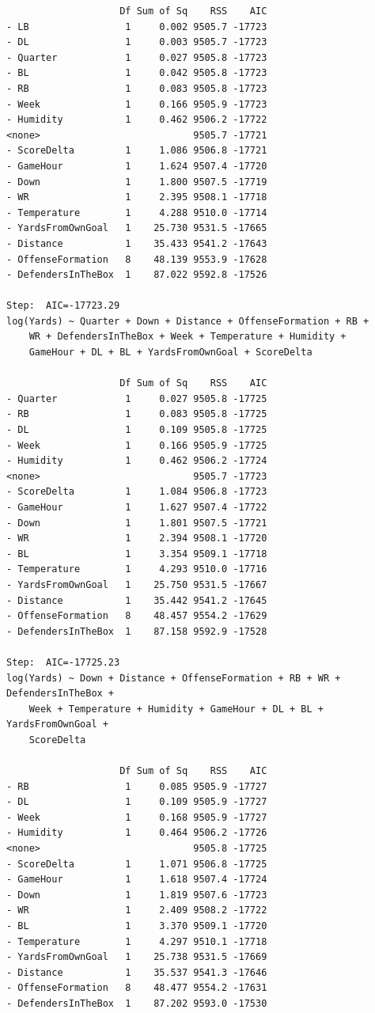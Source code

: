 \documentclass[
  super,
  preprint,
  3p]{elsarticle}
\begin{document}
\begin{verbatim}
                    Df Sum of Sq    RSS    AIC
- LB                 1     0.002 9505.7 -17723
- DL                 1     0.003 9505.7 -17723
- Quarter            1     0.027 9505.8 -17723
- BL                 1     0.042 9505.8 -17723
- RB                 1     0.083 9505.8 -17723
- Week               1     0.166 9505.9 -17723
- Humidity           1     0.462 9506.2 -17722
<none>                           9505.7 -17721
- ScoreDelta         1     1.086 9506.8 -17721
- GameHour           1     1.624 9507.4 -17720
- Down               1     1.800 9507.5 -17719
- WR                 1     2.395 9508.1 -17718
- Temperature        1     4.288 9510.0 -17714
- YardsFromOwnGoal   1    25.730 9531.5 -17665
- Distance           1    35.433 9541.2 -17643
- OffenseFormation   8    48.139 9553.9 -17628
- DefendersInTheBox  1    87.022 9592.8 -17526

Step:  AIC=-17723.29
log(Yards) ~ Quarter + Down + Distance + OffenseFormation + RB + 
    WR + DefendersInTheBox + Week + Temperature + Humidity + 
    GameHour + DL + BL + YardsFromOwnGoal + ScoreDelta

                    Df Sum of Sq    RSS    AIC
- Quarter            1     0.027 9505.8 -17725
- RB                 1     0.083 9505.8 -17725
- DL                 1     0.109 9505.8 -17725
- Week               1     0.166 9505.9 -17725
- Humidity           1     0.462 9506.2 -17724
<none>                           9505.7 -17723
- ScoreDelta         1     1.084 9506.8 -17723
- GameHour           1     1.627 9507.4 -17722
- Down               1     1.801 9507.5 -17721
- WR                 1     2.394 9508.1 -17720
- BL                 1     3.354 9509.1 -17718
- Temperature        1     4.293 9510.0 -17716
- YardsFromOwnGoal   1    25.750 9531.5 -17667
- Distance           1    35.442 9541.2 -17645
- OffenseFormation   8    48.457 9554.2 -17629
- DefendersInTheBox  1    87.158 9592.9 -17528

Step:  AIC=-17725.23
log(Yards) ~ Down + Distance + OffenseFormation + RB + WR + DefendersInTheBox + 
    Week + Temperature + Humidity + GameHour + DL + BL + YardsFromOwnGoal + 
    ScoreDelta

                    Df Sum of Sq    RSS    AIC
- RB                 1     0.085 9505.9 -17727
- DL                 1     0.109 9505.9 -17727
- Week               1     0.168 9505.9 -17727
- Humidity           1     0.464 9506.2 -17726
<none>                           9505.8 -17725
- ScoreDelta         1     1.071 9506.8 -17725
- GameHour           1     1.618 9507.4 -17724
- Down               1     1.819 9507.6 -17723
- WR                 1     2.409 9508.2 -17722
- BL                 1     3.370 9509.1 -17720
- Temperature        1     4.297 9510.1 -17718
- YardsFromOwnGoal   1    25.738 9531.5 -17669
- Distance           1    35.537 9541.3 -17646
- OffenseFormation   8    48.477 9554.2 -17631
- DefendersInTheBox  1    87.202 9593.0 -17530


\end{verbatim}
\end{document}
